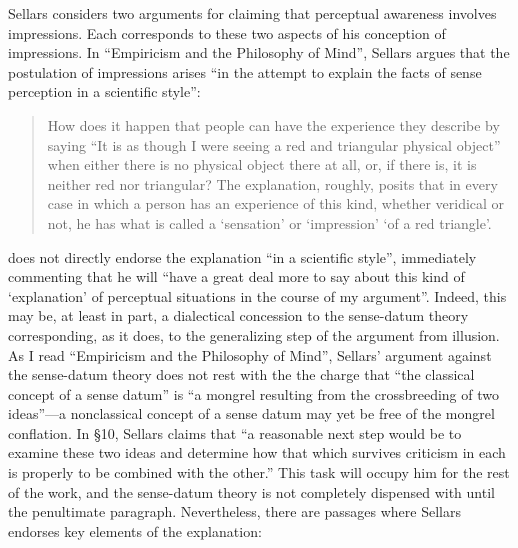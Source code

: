 \documentclass[12pt]{article}
\begin{document}

Sellars considers two arguments for claiming that perceptual awareness involves impressions. Each corresponds to these two aspects of his conception of impressions. In ``Empiricism and the Philosophy of Mind'', Sellars argues that the postulation of impressions arises ``in the attempt to explain the facts of sense perception in a scientific style'':
\begin{quote}
    How does it happen that people can have the experience they describe by saying ``It is as though I were seeing a red and triangular physical object'' when either there is no physical object there at all, or, if there is, it is neither red nor triangular? The explanation, roughly, posits that in every case in which a person has an experience of this kind, whether veridical or not, he has what is called a `sensation' or `impression' `of a red triangle'.  \citep[§7]{Sellars:1956xp} %
\end{quote}
\cite[§7]{Sellars:1956xp} does not directly endorse the explanation ``in a scientific style'', immediately commenting that he will ``have a great deal more to say about this kind of `explanation' of perceptual situations in the course of my argument''. Indeed, this may be, at least in part, a dialectical concession to the sense-datum theory corresponding, as it does, to the generalizing step of the argument from illusion. As I read ``Empiricism and the Philosophy of Mind'', Sellars' \citeyearpar[§7]{Sellars:1956xp} argument against the sense-datum theory does not rest with the the charge that ``the classical concept of a sense datum'' is ``a mongrel resulting from the crossbreeding of two ideas''---a nonclassical concept of a sense datum may yet be free of the mongrel conflation. In §10, Sellars claims that ``a reasonable next step would be to examine these two ideas and determine how that which survives criticism in each is properly to be combined with the other.'' This task will occupy him for the rest of the work, and the sense-datum theory is not completely dispensed with until the penultimate paragraph. Nevertheless, there are passages where Sellars endorses key elements of the explanation:
\end{document}
